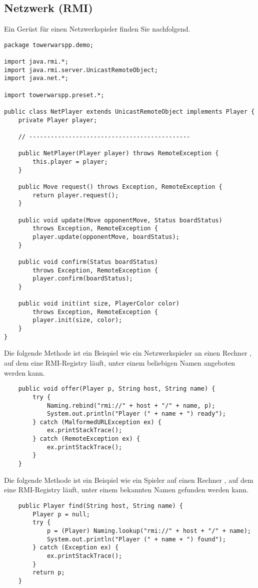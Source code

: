 \newpage
\subsection*{Netzwerk (RMI)}
Ein Gerüst für einen Netzwerkspieler finden Sie nachfolgend.
\begin{lstlisting}
package towerwarspp.demo;

import java.rmi.*;
import java.rmi.server.UnicastRemoteObject;
import java.net.*;

import towerwarspp.preset.*;

public class NetPlayer extends UnicastRemoteObject implements Player {
	private Player player;
	
	// ---------------------------------------------
	
	public NetPlayer(Player player) throws RemoteException {
		this.player = player;
	}
	
	public Move request() throws Exception, RemoteException {
		return player.request();
	}
	
	public void update(Move opponentMove, Status boardStatus)
		throws Exception, RemoteException {
		player.update(opponentMove, boardStatus);
	}
	
	public void confirm(Status boardStatus)
		throws Exception, RemoteException {
		player.confirm(boardStatus);
	}		
	
	public void init(int size, PlayerColor color)
		throws Exception, RemoteException {
		player.init(size, color);	
	} 
}
\end{lstlisting}

Die folgende Methode  ist ein Beispiel wie ein Netzwerkspieler an einen Rechner , auf dem eine RMI-Registry läuft, unter einem beliebigen Namen  angeboten werden kann.
\begin{lstlisting}
	public void offer(Player p, String host, String name) {
		try {
			Naming.rebind("rmi://" + host + "/" + name, p);
			System.out.println("Player (" + name + ") ready");
		} catch (MalformedURLException ex) {
			ex.printStackTrace();
		} catch (RemoteException ex) {
			ex.printStackTrace();
		}
	}
\end{lstlisting}

Die folgende Methode  ist ein Beispiel wie ein Spieler auf einen Rechner , auf dem eine RMI-Registry läuft, unter einem bekannten Namen  gefunden werden kann.
\begin{lstlisting}
	public Player find(String host, String name) {
		Player p = null;
		try {
			p = (Player) Naming.lookup("rmi://" + host + "/" + name);
			System.out.println("Player (" + name + ") found");
		} catch (Exception ex) {
			ex.printStackTrace();
		}
		return p;
	}
\end{lstlisting}